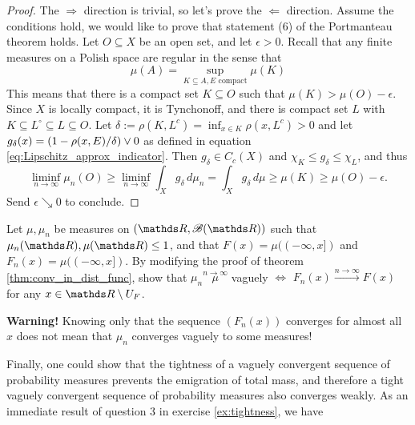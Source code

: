 \begin{unexaminable}
\begin{proof}
The $\Rightarrow$ direction is trivial, so let's prove the $\Leftarrow$ direction. Assume the conditions hold, we would like to prove that statement (6) of the Portmanteau theorem holds. Let $O \subseteq X$ be an open set, and let $\epsilon > 0$. Recall that any finite measures on a Polish space are regular in the sense that
\begin{equation}
\mu(A) = \sup_{K \subseteq A, E \text{ compact}} \mu(K)
\end{equation}
This means that there is a compact set $K \subseteq O$ such that $\mu(K) > \mu(O) - \epsilon$. Since $X$ is locally compact, it is Tynchonoff, and there is compact set $L$ with $K \subseteq L^\circ \subseteq L \subseteq O$. Let $\delta := \rho(K,L^c) = \inf_{x\in K} \rho(x,L^c) > 0$ and let $g_\delta(x) = \left( 1 - \rho(x,E)/\delta \right) \vee 0$ as defined in equation \eqref{eq:Lipschitz_approx_indicator}. Then $g_\delta \in C_c(X)$ and $\chi_K \leq g_\delta \leq \chi_L$, and thus
\begin{equation*}
\liminf_{n\to\infty} \mu_n(O) \geq \liminf_{n\to\infty} \int_X g_\delta \, d\mu_n = \int_X g_\delta \, d\mu \geq \mu(K) \geq \mu(O) - \epsilon. 
\end{equation*}
Send $\epsilon \searrow 0$ to conclude.
\end{proof}

\begin{exercise} \label{ex:conv_in_general_dist}
Let $\mu, \mu_n$ be measures on $(\R,\B(\R))$ such that $\mu_n(\R), \mu(\R) \leq 1$, and that $F(x) = \mu((-\infty,x])$ and $F_n(x) = \mu((-\infty,x])$. By modifying the proof of theorem \ref{thm:conv_in_dist_func}, show that $\mu_n \overset{n\to\infty} \mu$ vaguely $\iff$ $F_n(x) \overset{n\to\infty}\to F(x)$ for any $x \in \R \setminus U_F$. 
\end{exercise}

\begin{remark}
\textbf{Warning!} Knowing only that the sequence $(F_n(x))$ converges for almost all $x$ does not mean that $\mu_n$ converges vaguely to some measures!
\end{remark}

Finally, one could show that the tightness of a vaguely convergent sequence of probability measures prevents the emigration of total mass, and therefore a tight vaguely convergent sequence of probability measures also converges weakly. As an immediate result of question 3 in exercise \ref{ex:tightness}, we have


\end{unexaminable}
